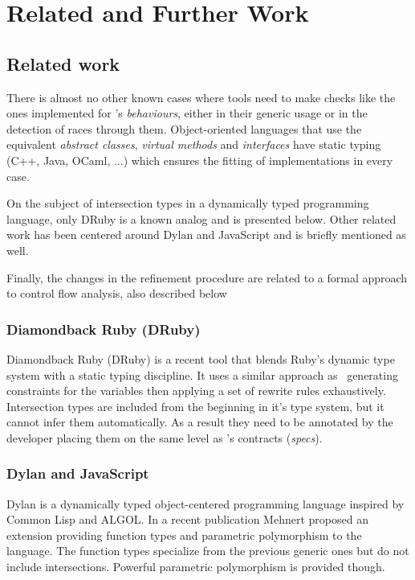 \chapter{Related and Further Work}
\label{chp:conclusion}

\section{Related work}
\label{sct:related_work}

There is almost no other known cases where tools need to make checks
like the ones implemented for \er's \emph{behaviours}, either in their
generic usage or in the detection of races through
them. Object-oriented languages that use the equivalent \emph{abstract
  classes}, \emph{virtual methods} and \emph{interfaces} have static
typing (C++, Java, OCaml, ...) which ensures the fitting of
implementations in every case.

On the subject of intersection types in a dynamically typed
programming language, only DRuby is a known analog and is presented
below. Other related work has been centered around Dylan and
JavaScript and is briefly mentioned as well.

Finally, the changes in the refinement procedure are related to a
formal approach to control flow analysis, also described below

\subsection{Diamondback Ruby (DRuby)}

Diamondback Ruby (DRuby)\cite{druby} is a recent tool that blends
Ruby's dynamic type system with a static typing discipline. It uses a
similar approach as \dr\ generating constraints for the variables then
applying a set of rewrite rules exhaustively. Intersection types are
included from the beginning in it's type system, but it cannot infer
them automatically. As a result they need to be annotated by the
developer placing them on the same level as \dr's contracts
(\emph{specs}).

\subsection{Dylan and JavaScript}

Dylan is a dynamically typed object-centered programming language
inspired by Common Lisp and ALGOL. In a recent publication Mehnert
proposed an extension providing function types and parametric
polymorphism to the language\cite{dylan}. The function types
specialize from the previous generic ones but do not include
intersections. Powerful parametric polymorphism is provided though.

